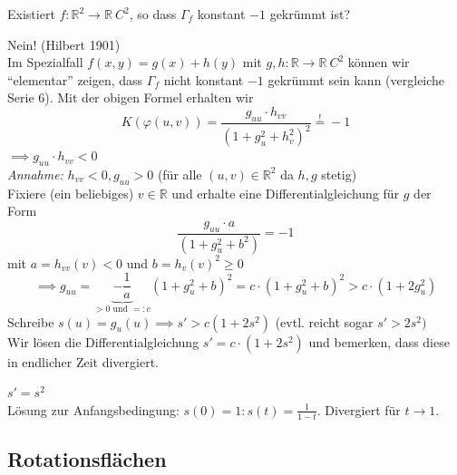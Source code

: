 \documentclass[../main.tex]{subfiles}
\begin{document}
\begin{question}
    Existiert $f:\mathbb{R}^{2}\rightarrow\mathbb{R} \ C^{2}$, so dass $\Gamma_{f}$ konstant $-1$ gekrümmt ist?
\end{question}
\begin{answer}
    Nein! (Hilbert 1901)\\
    Im Spezialfall $f(x,y)=g(x)+h(y)$ mit $g,h:\mathbb{R}\to\mathbb{R} \ C^{2}$ können wir ``elementar'' zeigen, dass $\Gamma_{f}$ nicht konstant $-1$ gekrümmt sein kann (vergleiche Serie 6). 
    Mit der obigen Formel erhalten wir $$K(\varphi(u,v)) = \frac{g_{uu}\cdot h_{vv}}{(1+g_{u}^{2}+h_{v}^{2})^{2}} \stackrel{!}{=} -1$$
    $\implies g_{uu} \cdot h_{vv} < 0$\\
    \emph{Annahme:} $h_{vv} <0, g_{uu}> 0$ (für alle $(u,v)\in\mathbb{R}^{2}$ da $h,g$ stetig)\\
    Fixiere (ein beliebiges) $v \in\mathbb{R}$ und erhalte eine Differentialgleichung für $g$ der Form 
    $$ \frac{g_{uu}\cdot a}{(1+g_{u}^{2}+b^{2})} = -1 $$ mit $a = h_{vv}(v) < 0$ und $b=h_{v}(v)^{2}\geq 0$
    $$\implies g_{uu} = \underbrace{-\frac{1}{a}}_{>0 \text{ und } =:c} (1+g_{u}^{2}+b)^{2} = c\cdot (1+g_{u}^{2}+b)^{2} > c\cdot (1 + 2g_{u}^{2})$$
    Schreibe $s(u) = g_{u}(u) \implies s'>c(1+2s^{2})$ (evtl. reicht sogar $s'>2s^{2})$\\
    Wir lösen die Differentialgleichung $s' = c\cdot (1 + 2s^{2})$ und bemerken, dass diese in endlicher Zeit divergiert. 
\end{answer}
\begin{example}
    $s'=s^{2}$\\
    Lösung zur Anfangsbedingung: $s(0) = 1: s(t)=\frac{1}{1-t}$. Divergiert für $t\to 1$.
\end{example}
\pagebreak

\subsection*{Rotationsflächen}
\end{document}
